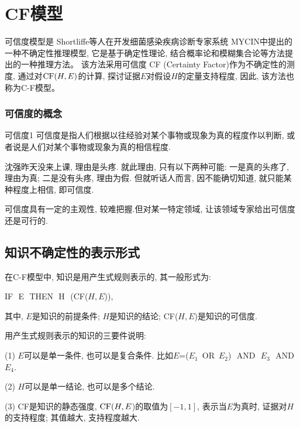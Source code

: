 \section{CF模型}
可信度模型是 Shortliffe等人在开发细菌感染疾病诊断专家系统 MYCIN中提出的一种不确定性推理模型, 它是基于确定性理论, 结合概率论和模糊集合论等方法提出的一种推理方法。
该方法采用可信度 CF (Certainty Factor)作为不确定性的测度, 通过对$\textup{CF}(H,E)$的计算, 探讨证据$E$对假设$H$的定量支持程度, 因此, 该方法也称为C-F模型。
\subsubsection{可信度的概念}
\begin{mydef}{可信度}{1}
    可信度是指人们根据以往经验对某个事物或现象为真的程度作以判断, 或者说是人们对某个事物或现象为真的相信程度.
\end{mydef}

\begin{example}
  沈强昨天没来上课, 理由是头疼. 就此理由, 只有以下两种可能: 一是真的头疼了, 理由为真; 二是没有头疼, 理由为假. 但就听话人而言, 因不能确切知道, 就只能某种程度上相信, 即可信度.
\end{example}

\begin{remark}
    可信度具有一定的主观性, 较难把握.但对某一特定领域, 让该领域专家给出可信度还是可行的.
\end{remark}
\subsection{知识不确定性的表示形式}
在C-F模型中, 知识是用产生式规则表示的, 其一般形式为:
\begin{center}
    IF\,\,   E\,\,    THEN\,\,  H\,\, (CF($H, E$)),
\end{center}
其中, $E$是知识的前提条件; $H$是知识的结论; CF($H, E$)是知识的可信度.
\begin{remark}
用产生式规则表示的知识的三要件说明:

(1) $E$可以是单一条件, 也可以是复合条件. 比如$E$=($E_1$\,  \textup{OR}\,  $E_2$)\,\,  \textup{AND}\,\,  $E_3$\,\, \textup{AND}\,\,  $E_4$.

(2) $H$可以是单一结论, 也可以是多个结论.

(3) \textup{CF}是知识的静态强度, $\textup{CF}(H, E$)的取值为$[-1, 1]$, 表示当$E$为真时, 证据对$H$的支持程度; 其值越大, 支持程度越大.
\end{remark}

